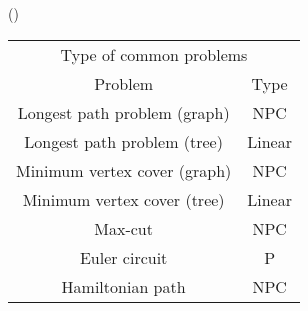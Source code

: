\item \begin{theorem}{()} \quad\quad
    \begin{table}[H]
        \centering
        \begin{tabular}{|c|c|}
            \hline
            \multicolumn{2}{|c|}{Type of common problems} \\
            \Xhline{3\arrayrulewidth}
            Problem & Type \\
            \Xhline{2\arrayrulewidth}
            Longest path problem (graph) & NPC \\
            \hline
            Longest path problem (tree) & Linear \\
            \hline
            Minimum vertex cover (graph) & NPC \\
            \hline
            Minimum vertex cover (tree) & Linear \\ 
            \hline
            Max-cut & NPC \\
            \hline
            Euler circuit & P \\
            \hline
            Hamiltonian path & NPC \\
            \hline
        \end{tabular}
    \end{table}
\end{theorem}
